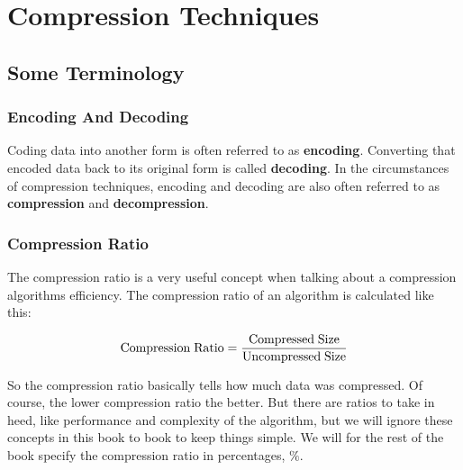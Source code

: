 \begin{comment}
  
\end{comment}
\chapter{Compression Techniques}
\label{cha:compress-techn}

\begin{refsection}

\section{Some Terminology}
\label{sec:some-terminology}

\subsection{Encoding And Decoding}
\label{sec:encoding-decoding}

Coding data into another form is often referred to as
\textbf{encoding}. Converting that encoded data back
to its original form is called
\textbf{decoding}.  In the circumstances of compression techniques, encoding and
decoding are also often referred to as
\textbf{compression} and
\textbf{decompression}.

\subsection{Compression Ratio}
\label{sec:compression-ratio}

The compression ratio is a very useful concept when talking about a
compression algorithms efficiency. The compression ratio of an
algorithm is calculated like this:

\begin{equation}
  \label{eq:compress-ratio}
  {\rm Compression\;Ratio} = \frac{\rm Compressed\;Size}{\rm Uncompressed\;Size}
\end{equation}

So the compression ratio basically tells how much data was
compressed. Of course, the lower compression ratio the better. But
there are ratios to take in heed, like performance and complexity of
the algorithm, but we will ignore these concepts in this book to book
to keep things simple. We will for the rest of the book specify the
compression ratio in percentages, $\%$\cite{Salomon:2004:DCC}.


\end{refsection}
